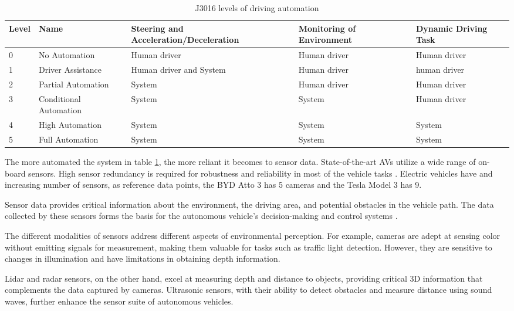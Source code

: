 \begin{table}[htb]
\footnotesize
\begin{tabular}{|p{1.0cm}|p{3.0cm}|p{3.5cm}|p{3.3cm}|p{3.3cm}|}
   \hline
   \textbf{Level} & \textbf{Name}  & \textbf{Steering and Acceleration/Deceleration}  & \textbf{Monitoring of Environment}  & \textbf{Dynamic Driving Task} \\
    \hline
    0 & No Automation  & Human driver & Human driver  & Human driver \\
    \hline
    1 & Driver Assistance & Human driver and System & Human driver & human driver \\
    \hline
    2 & Partial Automation & System & Human driver & Human driver \\
    \hline
    3 & Conditional Automation & System & System & Human driver \\
    \hline
    4 & High Automation & System & System & System \\
    \hline
    5 & Full Automation & System & System & System \\
    \hline
\end{tabular}
\caption{J3016 levels of driving automation}
\label{tab-levels}
\end{table}

The more automated the system in table \ref{tab-levels}, the more reliant it becomes to sensor data. State-of-the-art AVs utilize a wide range of on-board sensors. High sensor redundancy is required for robustness and reliability in most of the vehicle tasks \cite{9046805}. Electric vehicles have and increasing number of sensors, as reference data points, the BYD Atto 3 has 5 cameras and the Tesla Model 3 has 9.

Sensor data provides critical information about the environment, the driving area, and potential obstacles in the vehicle path. The data collected by these sensors forms the basis for the autonomous vehicle's decision-making and control systems \cite{li2023learning}.

The different modalities of sensors address different aspects of environmental perception. For example, cameras are adept at sensing color without emitting signals for measurement, making them valuable for tasks such as traffic light detection. However, they are sensitive to changes in illumination and have limitations in obtaining depth information. 

Lidar and radar sensors, on the other hand, excel at measuring depth and distance to objects, providing critical 3D information that complements the data captured by cameras. Ultrasonic sensors, with their ability to detect obstacles and measure distance using sound waves, further enhance the sensor suite of autonomous vehicles.

